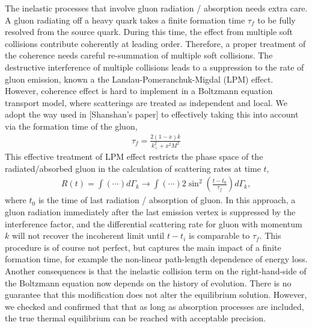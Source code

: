 \documentclass[aps, prc, reprint, amsmath, groupedaddress, nofootinbib]{revtex4-1}
\begin{document}
The inelastic processes that involve gluon radiation / absorption needs extra care. 
A gluon radiating off a heavy quark takes a finite formation time $\tau_f$ to be fully resolved from the source quark. During this time, the effect from multiple soft collisions contribute coherently at leading order.
Therefore, a proper treatment of the coherence needs careful re-summation of multiple soft collisions.
The destructive interference of multiple collisions leads to a suppression to the rate of gluon emission, known a the Landau-Pomeranchuk-Migdal (LPM) effect.
However, coherence effect is hard to implement in a Boltzmann equation transport model, where scatterings are treated as independent and local.
We adopt the way used in [Shanshan's paper] to effectively taking this into account via the formation time of the gluon,
\begin{eqnarray}
\tau_f = \frac{2(1-x)k}{k_\perp^2 + x^2M^2}
\end{eqnarray}
This effective treatment of LPM effect restricts the phase space of the radiated/absorbed gluon in the calculation of scattering rates at time $t$,
\begin{eqnarray}
R(t) = \int (\cdots)d\Gamma_k \rightarrow \int (\cdots) 2\sin^2\left(\frac{t-t_0}{\tau_f}\right)d\Gamma_k,
\end{eqnarray}
where $t_0$ is the time of last radiation / absorption of gluon.
In this approach, a gluon radiation immediately after the last emission vertex is suppressed by the interference factor, and the differential scattering rate for gluon with momentum $k$ will not recover the incoherent limit until $t-t_i$ is comparable to $\tau_f$.
This procedure is of course not perfect, but captures the main impact of a finite formation time, for example the non-linear path-length dependence of energy loss.
Another consequences is that the inelastic collision term on the right-hand-side of the Boltzmann equation now depends on the history of evolution.
There is no guarantee that this modification does not alter the equilibrium solution.
However, we checked and confirmed that that as long as absorption processes are included, the true thermal equilibrium can be reached with acceptable precision.
\end{document}
